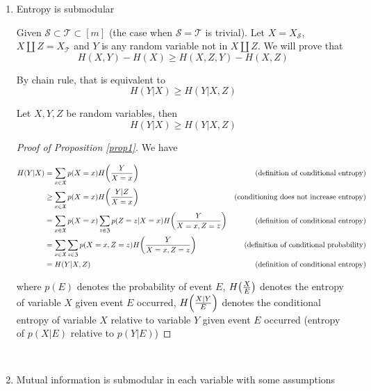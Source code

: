\documentclass{article}
\begin{document}
\begin{longproof}
\begin{enumerate}
\item Entropy is submodular

    Given $\mathcal{S} \subset \mathcal{T} \subset [m]$ (the case when $\mathcal{S} = \mathcal{T}$ is trivial).
    Let $X = X_\mathcal{S}$, $X \coprod Z = X_\mathcal{T}$ and $Y$ is any random variable not in $X \coprod Z$. We will prove that
    $$
        H(X, Y) - H(X) \geq H(X, Z, Y) - H(X, Z)
    $$

    By chain rule, that is equivalent to
    $$
        H(Y | X) \geq H(Y | X, Z)
    $$

    \begin{proposition}
        \label{prop1}
        Let $X, Y, Z$ be random variables, then
        $$
            H(Y|X) \geq H(Y|X, Z)
        $$
    \end{proposition}

    \begin{proof}[Proof of Proposition \ref{prop1}]
    We have

    \begin{align*}
        H(Y | X)
        &= \sum_{x \in \mathfrak{X}} p(X=x) H\tuple*{\frac{Y}{X=x}} &\text{(definition of conditional entropy)}\\
        &\geq \sum_{x \in \mathfrak{X}} p(X=x) H\tuple*{\frac{Y | Z}{X=x}} &\text{(conditioning does not increase entropy)} \\
        &= \sum_{x \in \mathfrak{X}} p(X=x) \sum_{z \in \mathfrak{Z}} p(Z=z|X=x) H\tuple*{\frac{Y}{X=x,Z=z}} &\text{(definition of conditional entropy)} \\
        &= \sum_{x \in \mathfrak{X}} \sum_{z \in \mathfrak{Z}} p(X=x,Z=z) H\tuple*{\frac{Y}{X=x,Z=z}} &\text{(definition of conditional probability)} \\
        &= H(Y|X,Z) &\text{(definition of conditional entropy)}
    \end{align*}

    where $p(E)$ denotes the probability of event $E$, $H\tuple*{\frac{X}{E}}$ denotes the entropy of variable $X$ given event $E$ occurred, $H\tuple*{\frac{X | Y}{E}}$ denotes the conditional entropy of variable $X$ relative to variable $Y$ given event $E$ occurred (entropy of $p(X|E)$ relative to $p(Y|E)$)
    \end{proof}

    \

\item Mutual information is submodular in each variable with some assumptions


\end{enumerate}
\end{longproof}
\end{document}
